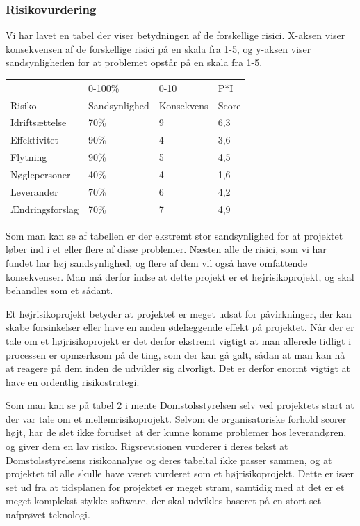 \documentclass[10pt,a4paper,danish]{article}
\begin{document}
\subsubsection{Risikovurdering}
Vi har lavet en tabel der viser betydningen af de forskellige risici. X-aksen viser konsekvensen af de forskellige risici på en skala fra 1-5, og y-aksen viser sandsynligheden for at problemet opstår på en skala fra 1-5.

\begin{tabular}{l|l|l|l}
           & 0-100\%       & 0-10       & P*I   \\
Risiko     & Sandsynlighed & Konsekvens & Score \\\hline
Idriftsættelse & 70\% & 9 & 6,3 \\
Effektivitet   & 90\% & 4 & 3,6 \\
Flytning   & 90\% & 5 & 4,5 \\
Nøglepersoner & 40\% & 4 & 1,6 \\
Leverandør & 70\% & 6 & 4,2\\
Ændringsforslag & 70\% & 7 & 4,9 \\
\end{tabular}

Som man kan se af tabellen er der ekstremt stor sandsynlighed for at projektet løber ind i et eller flere af disse problemer. Næsten alle de risici, som vi har fundet har høj sandsynlighed, og flere af dem vil også have omfattende konsekvenser. Man må derfor indse at dette projekt er et højrisikoprojekt, og skal behandles som et sådant.

Et højrisikoprojekt betyder at projektet er meget udsat for påvirkninger, der kan skabe forsinkelser eller have en anden ødelæggende effekt på projektet. Når der er tale om et højrisikoprojekt er det derfor ekstremt vigtigt at man allerede tidligt i processen er opmærksom på de ting, som der kan gå galt, sådan at man kan nå at reagere på dem inden de udvikler sig alvorligt. Det er derfor enormt vigtigt at have en ordentlig risikostrategi.

Som man kan se på tabel 2 i \cite[~s. 20]{Rigs} mente Domstolsstyrelsen selv ved projektets start at der var tale om et mellemrisikoprojekt. Selvom de organisatoriske forhold scorer højt, har de slet ikke forudset at der kunne komme problemer hos leverandøren, og giver dem en lav risiko. Rigsrevisionen vurderer i deres tekst at Domstolsstyrelsens risikoanalyse og deres tabeltal ikke passer sammen, og at projektet til alle skulle have været vurderet som et højrisikoprojekt. Dette er især set ud fra at tidsplanen for projektet er meget stram, samtidig med at det er et meget komplekst stykke software, der skal udvikles baseret på en stort set uafprøvet teknologi.
\end{document}
